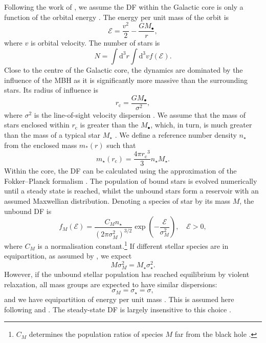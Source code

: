 \documentclass[useAMS,usedcolumn,usegraphicx,usenatbib]{mn2e}
\newcommand{\sub}[1]{\ensuremath{_\mathrm{#1}}}
\newcommand{\dd}{\ensuremath{\mathrm{d}}}
\begin{document}
Following the work of \citet{Bahcall1976, Bahcall1977}, we assume the DF within the Galactic core is only a function of the orbital energy \citep{Shapiro1978}. The energy per unit mass of the orbit is
\begin{equation}
\mathcal{E} = \frac{v^2}{2} - \frac{GM_\bullet}{r},
\end{equation}
where $v$ is orbital velocity. The number of stars is
\begin{equation}
N = \int \dd^3r \int \dd^3v f(\mathcal{E}).
\end{equation}
Close to the centre of the Galactic core, the dynamics are dominated by the influence of the MBH as it is significantly more massive than the surrounding stars. Its radius of influence is
\begin{equation}
r\sub{c} = \frac{GM_\bullet}{\sigma^2},
\label{eq:r_c}
\end{equation}
where $\sigma^2$ is the line-of-sight velocity dispersion \citep{Frank1976}. We assume that the mass of stars enclosed within $r\sub{c}$ is greater than the $M_\bullet$, which, in turn, is much greater than the mass of a typical star $M_\star$ \citep{Bahcall1976}. We define a reference number density $n_\star$ from the enclosed mass $m_\ast(r)$ such that
\begin{equation}
m_\star(r\sub{c}) = \frac{4\pi r\sub{c}^3}{3}n_\star M_\star.
\end{equation}
Within the core, the DF can be calculated using the approximation of the Fokker--Planck formalism \citep[section 7.4]{Binney2008}. The population of bound stars is evolved numerically until a steady state is reached, whilst the unbound stars form a reservoir with an assumed Maxwellian distribution. Denoting a species of star by its mass $M$, the unbound DF is
\begin{equation}
f_M(\mathcal{E}) = \frac{C_M n_\star}{(2\pi\sigma_M^2)^{3/2}} \exp\left(-\frac{\mathcal{E}}{\sigma_M^2}\right),\quad\mathcal{E} > 0,
\label{eq:Unbound_DF}
\end{equation}
where $C_M$ is a normalisation constant.\footnote{$C_M$ determines the population ratios of species $M$ far from the black hole \citep{Alexander2009}.} If different stellar species are in equipartition, as assumed by \citet{Bahcall1976, Bahcall1977}, we expect
\begin{equation}
M \sigma_M^2 = M_\star \sigma_\star^2.
\end{equation}
However, if the unbound stellar population has reached equilibrium by violent relaxation, all mass groups are expected to have similar dispersions:
\begin{equation}
\sigma_M = \sigma_\star = \sigma,
\end{equation}
and we have equipartition of energy per unit mass \citep{Lynden-Bell1967}. This is assumed here following \citet{Alexander2009} and \citet{O'Leary2009}. The steady-state DF is largely insensitive to this choice \citep{Bahcall1977, Alexander2009}.
\end{document}
